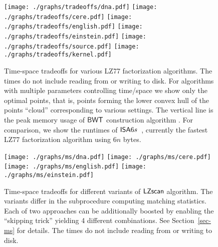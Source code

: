 \documentclass[runningheads]{llncs}
\def\BWT{\mbox{\rm L}}
\def\ISA{\mbox{\rm {\sf ISA}}}
\def\BWT{\mbox{\rm {\sf BWT}}}
\def\LZSCAN{\mbox{\sf LZscan}}
\begin{document}
\begin{figure}
  \texttt{[image: ./graphs/tradeoffs/dna.pdf]}
\endminipage\hfill
{}
  \texttt{[image: ./graphs/tradeoffs/cere.pdf]}
\endminipage
\vspace{1ex}
\newline
{}
  \texttt{[image: ./graphs/tradeoffs/english.pdf]}
\endminipage\hfill
{}
  \texttt{[image: ./graphs/tradeoffs/einstein.pdf]}
\endminipage
\vspace{1ex}
\newline
{}
  \texttt{[image: ./graphs/tradeoffs/source.pdf]}
\endminipage\hfill
{}
  \texttt{[image: ./graphs/tradeoffs/kernel.pdf]}
\endminipage
\vspace{4ex}
\caption{\label{fig-all} Time-space tradeoffs for various LZ77
  factorization algorithms. The times do not include reading from or
  writing to disk. For algorithms with multiple parameters controlling
  time/space we show only the optimal points, that is, points forming
  the lower convex hull of the points ``cloud'' corresponding to various
  settings. The vertical line is the peak memory usage of $\BWT$
  construction algorithm \cite{os2009}. For comparison, we show the
  runtimes of $\ISA 6s$~\cite{kp2013}, currently
  the fastest LZ77 factorization algorithm using  $6n$ bytes.}
\end{figure}


\begin{figure}
  \texttt{[image: ./graphs/ms/dna.pdf]}
\endminipage\hfill
{}
  \texttt{[image: ./graphs/ms/cere.pdf]}
\endminipage
\vspace{1ex}
\newline
{}
  \texttt{[image: ./graphs/ms/english.pdf]}
\endminipage\hfill
{}
  \texttt{[image: ./graphs/ms/einstein.pdf]}
\endminipage
\vspace{4ex}
\caption{\label{fig-variants} Time-space tradeoffs for different variants of
  $\LZSCAN$ algorithm. The variants differ in the subprocedure
  computing matching statistics. Each of two approaches can be additionally boosted
  by enabling the ``skipping trick'' yielding 4 different combinations.
  See Section~\ref{sec-ms} for details. The times do not include reading
  from or writing to disk.}
\end{figure}



\end{document}
